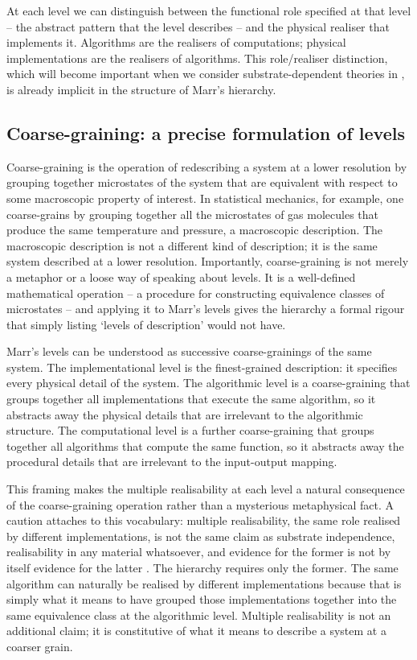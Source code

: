 \documentclass[11pt, a4paper, onecolumn, gdm]{google}
\begin{document}
At each level we can distinguish between the functional role specified at that level -- the abstract pattern that the level describes -- and the physical realiser that implements it.
Algorithms are the realisers of computations; physical implementations are the realisers of algorithms.
This role/realiser distinction, which will become important when we consider substrate-dependent theories in , is already implicit in the structure of Marr's hierarchy.

\subsection{Coarse-graining: a precise formulation of levels}\label{coarse-graining-a-precise-formulation-of-levels}

Coarse-graining is the operation of redescribing a system at a lower resolution by grouping together microstates of the system that are equivalent with respect to some macroscopic property of interest.
In statistical mechanics, for example, one coarse-grains by grouping together all the microstates of gas molecules that produce the same temperature and pressure, a macroscopic description.
The macroscopic description is not a different kind of description; it is the same system described at a lower resolution.
Importantly, coarse-graining is not merely a metaphor or a loose way of speaking about levels.
It is a well-defined mathematical operation -- a procedure for constructing equivalence classes of microstates -- and applying it to Marr's levels gives the hierarchy a formal rigour that simply listing `levels of description' would not have.

Marr's levels can be understood as successive coarse-grainings of the same system.
The implementational level is the finest-grained description: it specifies every physical detail of the system.
The algorithmic level is a coarse-graining that groups together all implementations that execute the same algorithm, so it abstracts away the physical details that are irrelevant to the algorithmic structure.
The computational level is a further coarse-graining that groups together all algorithms that compute the same function, so it abstracts away the procedural details that are irrelevant to the input-output mapping.

This framing makes the multiple realisability at each level a natural consequence of the coarse-graining operation rather than a mysterious metaphysical fact.
A caution attaches to this vocabulary: multiple realisability, the same role realised by different implementations, is not the same claim as substrate independence, realisability in any material whatsoever, and evidence for the former is not by itself evidence for the latter \citep{polger2016}.
The hierarchy requires only the former.
The same algorithm can naturally be realised by different implementations because that is simply what it means to have grouped those implementations together into the same equivalence class at the algorithmic level.
Multiple realisability is not an additional claim; it is constitutive of what it means to describe a system at a coarser grain.
\end{document}
